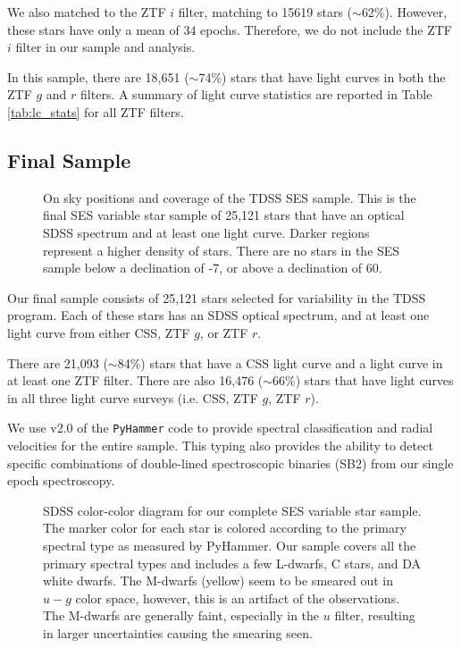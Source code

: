 \documentclass[twocolumn, tighten, astrosymb]{aastex631}
\begin{document}
We also matched to the ZTF $i$ filter, matching to 15619 stars ($\sim$62\%). However, these stars have only a mean of $34$ epochs. Therefore, we do not include the ZTF $i$ filter in our sample and analysis. 

In this sample, there are 18,651 ($\sim$74\%) stars that have light curves in both the ZTF $g$ and $r$ filters. A summary of light curve statistics are reported in Table \ref{tab:lc_stats} for all ZTF filters. 

\subsection{Final Sample}\label{subsec:finalsample}


\begin{figure*}
\centering
\caption{On sky positions and coverage of the TDSS SES sample. This is the final SES variable star sample of 25,121 stars that have an optical SDSS spectrum and at least one light curve. Darker regions represent a higher density of stars. There are no stars in the SES sample below a declination of -7\degr, or above a declination of 60\degr.}
\label{fig:sample_onsky}
\end{figure*}

Our final sample consists of 25,121 stars selected for variability in the TDSS program. Each of these stars has an SDSS optical spectrum, and at least one light curve from either CSS, ZTF $g$, or ZTF $r$.

There are 21,093 ($\sim$84\%) stars that have a CSS light curve and a light curve in at least one ZTF filter. There are also 16,476 ($\sim$66\%) stars that have light curves in all three light curve surveys (i.e. CSS, ZTF $g$, ZTF $r$).

We use v2.0 of the \texttt{PyHammer} code \citep{Roulston2020} to provide spectral classification and radial velocities for the entire sample. This typing also provides the ability to detect specific combinations of double-lined spectroscopic binaries (SB2) from our single epoch spectroscopy. 

\begin{figure}
\centering
{}
\caption{SDSS color-color diagram for our complete SES variable star sample. The marker color for each star is colored according to the primary spectral type as measured by PyHammer. Our sample covers all the primary spectral types and includes a few L-dwarfs, C stars, and DA white dwarfs. The M-dwarfs (yellow) seem to be smeared out in $u-g$ color space, however, this is an artifact of the observations. The M-dwarfs are generally faint, especially in the $u$ filter, resulting in larger uncertainties causing the smearing seen.}
\label{fig:gmr_umg}
\end{figure}
\end{document}
